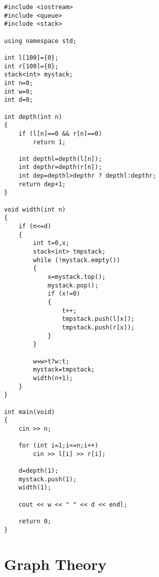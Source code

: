 \documentclass[a4paper]{article}
\begin{document}
\begin{verbatim}
#include <iostream>
#include <queue>
#include <stack>

using namespace std;

int l[100]={0};
int r[100]={0};
stack<int> mystack;
int n=0;
int w=0;
int d=0;

int depth(int n)
{
	if (l[n]==0 && r[n]==0)
		return 1;

	int depthl=depth(l[n]);
	int depthr=depth(r[n]);
	int dep=depthl>depthr ? depthl:depthr;
	return dep+1;
}

void width(int n)
{
	if (n<=d)
	{
		int t=0,x;
		stack<int> tmpstack;
		while (!mystack.empty())
		{
			x=mystack.top();
			mystack.pop();
			if (x!=0)
			{
				t++;
				tmpstack.push(l[x]);
				tmpstack.push(r[x]);
			}
		}

		w=w>t?w:t;
		mystack=tmpstack;
		width(n+1);
	}
}

int main(void)
{
	cin >> n;

	for (int i=1;i<=n;i++)
		cin >> l[i] >> r[i];

	d=depth(1);
	mystack.push(1);
	width(1);

	cout << w << " " << d << endl;

	return 0;
}
\end{verbatim}

\section{Graph Theory}
\end{document}
